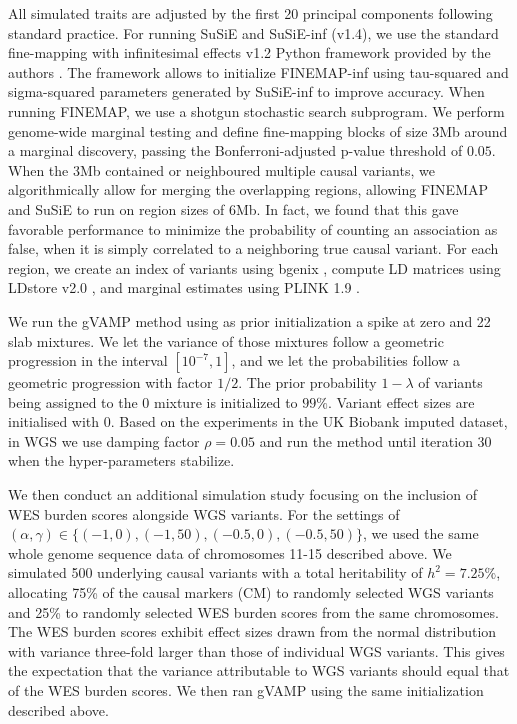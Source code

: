 All simulated traits are adjusted by the first 20 principal components following standard practice. For running SuSiE and SuSiE-inf (v1.4), we use the standard fine-mapping with infinitesimal effects v1.2 Python framework provided by the authors \cite{infinitesimalFineMapping2024}. The framework allows to initialize FINEMAP-inf using tau-squared and sigma-squared parameters generated by SuSiE-inf to improve accuracy. When running FINEMAP, we use a shotgun stochastic search subprogram. We perform genome-wide marginal testing and define fine-mapping blocks of size $3$Mb around a marginal discovery, passing the Bonferroni-adjusted p-value threshold of $0.05$. When the $3$Mb contained or neighboured multiple causal variants, we algorithmically allow for merging the overlapping regions, allowing FINEMAP and SuSiE to run on region sizes of $6$Mb. In fact, we found that this gave favorable performance to minimize the probability of counting an association as false, when it is simply correlated to a neighboring true causal variant. For each region, we create an index of variants using bgenix \cite{band_bgenn_2018}, compute LD matrices using LDstore v2.0 \cite{benner_prospect_2017}, and marginal estimates using PLINK 1.9 \cite{Chang2015}. 

We run the gVAMP method using as prior initialization a spike at zero and 22 slab mixtures. We let the variance of those mixtures follow a geometric progression in the interval $[10^{-7}, 1]$, and we let the probabilities follow a geometric progression with factor $1/2$. The prior probability $1-\lambda$ of variants being assigned to the 0 mixture is initialized to $99\%$. Variant effect sizes are initialised with $0$. Based on the experiments in the UK Biobank imputed dataset, in WGS we use damping factor $\rho=0.05$ and run the method until iteration 30 when the hyper-parameters stabilize. 

We then conduct an additional simulation study focusing on the inclusion of WES burden scores alongside WGS variants. For the settings of $(\alpha, \gamma) \in \{(-1, 0), (-1, 50), \allowbreak (-0.5, 0), \allowbreak (-0.5, 50) \}$, we used the same whole genome sequence data of chromosomes 11-15 described above. We simulated 500 underlying causal variants with a total heritability of $h^2=7.25\%$, allocating 75\% of the causal markers (CM) to randomly selected WGS variants and 25\% to randomly selected WES burden scores from the same chromosomes. The WES burden scores exhibit effect sizes drawn from the normal distribution with variance three-fold larger than those of individual WGS variants. This gives the expectation that the variance attributable to WGS variants should equal that of the WES burden scores. 
We then ran gVAMP using the same initialization described above.


